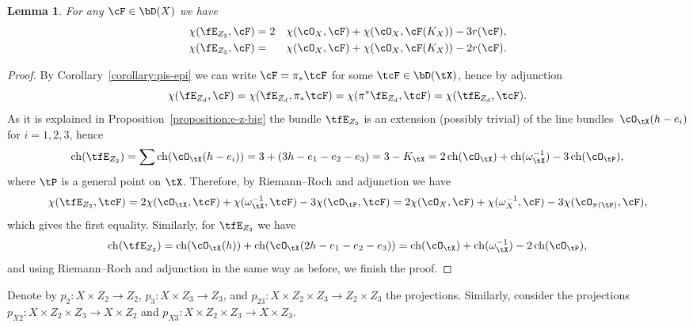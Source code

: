 \documentclass[11pt]{amsart}
\DeclareMathOperator{\ch}{\mathrm{ch}}
\theoremstyle{plain}
\newtheorem{lemma}[theorem]{Lemma}
\theoremstyle{definition}
\theoremstyle{remark}
\begin{document}
\begin{lemma}\label{lemma:chi-ez-f}
For any $\cF \in \bD(X)$ we have
\begin{alignat*}{2}
\chi(\fE_{Z_2},\cF) &= 2 &&\chi(\cO_X,\cF) + \chi(\cO_X,\cF(K_X)) - 3r(\cF),\\
\chi(\fE_{Z_3},\cF) &=   &&\chi(\cO_X,\cF) + \chi(\cO_X,\cF(K_X)) - 2r(\cF).
\end{alignat*}
\end{lemma}
\begin{proof}
By Corollary~\ref{corollary:pis-epi} we can write $\cF = \pi_*\tcF$ for some $\tcF \in \bD(\tX)$, hence by adjunction
\begin{equation*}
\chi(\fE_{Z_d}, \cF) = \chi(\fE_{Z_d},\pi_*\tcF) = \chi(\pi^*\fE_{Z_d},\tcF) = \chi(\tfE_{Z_d},\tcF).
\end{equation*}
As it is explained in Proposition~\ref{proposition:e-z-big} the bundle $\tfE_{Z_2}$ 
is an extension (possibly trivial) of the line bundles~$\cO_\tX(h-e_i)$ for $i = 1,2,3$, hence 
\begin{equation*}
\ch(\tfE_{Z_2}) = \sum \ch(\cO_\tX(h-e_i)) = 3 + (3h - e_1 - e_2 - e_3) = 3 - K_\tX = 2\ch(\cO_\tX) + \ch(\omega_\tX^{-1}) - 3\ch(\cO_\tP),
\end{equation*}
where $\tP$ is a general point on $\tX$.
Therefore, by Riemann--Roch and adjunction we have
\begin{equation*}
\chi(\tfE_{Z_2},\tcF) = 
2\chi(\cO_\tX,\tcF) + \chi(\omega_\tX^{-1},\tcF) - 3\chi(\cO_\tP,\tcF) =
2\chi(\cO_X,\cF) + \chi(\omega_X^{-1},\cF) - 3\chi(\cO_{\pi(\tP)},\cF),
\end{equation*}
which gives the first equality.
Similarly, for $\tfE_{Z_3}$ we have
\begin{equation*}
\ch(\tfE_{Z_3}) = \ch(\cO_\tX(h)) + \ch(\cO_\tX(2h - e_1 - e_2 - e_3)) = 
\ch(\cO_\tX) + \ch(\omega_\tX^{-1}) - 2\ch(\cO_\tP),
\end{equation*}
and using Riemann--Roch and adjunction in the same way as before, we finish the proof.
\end{proof}



Denote by $p_2 \colon X \times Z_2 \to Z_2$, $p_3 \colon X \times Z_3 \to Z_3$, and $p_{23} \colon X \times Z_2 \times Z_3 \to Z_2 \times Z_3$ the projections.
Similarly, consider the projections $p_{X2} \colon X \times Z_2 \times Z_3 \to X \times Z_2$ and $p_{X3} \colon X \times Z_2 \times Z_3 \to X \times Z_3$.
\end{document}

